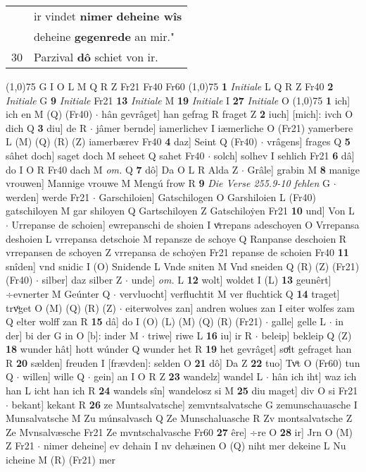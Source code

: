 \documentclass[8pt,a4paper,notitlepage]{article}
\begin{document}
\begin{table}[ht]
\begin{minipage}[t]{0.5\linewidth}
\begin{tabular}{rl}
 & ir vindet \textbf{nimer} \textbf{deheine wîs}\\ 
 & deheine \textbf{gegenrede} an mir."\\ 
30 & Parzival \textbf{dô} schiet von ir.\\ 
\end{tabular}
\scriptsize
\line(1,0){75} \newline
G I O L M Q R Z Fr21 Fr40 Fr60 \newline
\line(1,0){75} \newline
\textbf{1} \textit{Initiale} L Q R Z Fr40  \textbf{2} \textit{Initiale} G  \textbf{9} \textit{Initiale} Fr21  \textbf{13} \textit{Initiale} M  \textbf{19} \textit{Initiale} I  \textbf{27} \textit{Initiale} O  \newline
\line(1,0){75} \newline
\textbf{1} ich] ich en M (Q) (Fr40)  $\cdot$ hân gevrâget] han gefrag R fraget Z \textbf{2} iuch] [mich]: ivch O dich Q \textbf{3} diu] de R  $\cdot$ jâmer bernde] iamerlichev I iæmerliche O (Fr21) yamerbere L (M) (Q) (R) (Z) iamerbærev Fr40 \textbf{4} daz] Seint Q (Fr40)  $\cdot$ vrâgens] frages Q \textbf{5} sâhet doch] saget doch M seheet Q sahet Fr40  $\cdot$ solch] solhev I sehlich Fr21 \textbf{6} dâ] do I O R Fr40 dach M \textit{om.} Q \textbf{7} dô] Da O L R Alda Z  $\cdot$ Grâle] grabin M \textbf{8} manige vrouwen] Mannige vrouwe M Mengú frow R \textbf{9} \textit{Die Verse 255.9-10 fehlen} G   $\cdot$ werden] werde Fr21  $\cdot$ Garschiloien] Gatschilogen O Garshiloien L (Fr40) gatschiloyen M gar shiloyen Q Gartschiloyen Z Gatschiloẏen Fr21 \textbf{10} und] Von L  $\cdot$ Urrepanse de schoien] ewrepanschi de shoien I vͤrrepans adeschoyen O Vrrepansa deshoien L vrrepansa detschoie M repansze de schoye Q Ranpanse deschoien R vrrepansen de schoyen Z vrrepansa de schoẏen Fr21 repanse de schoien Fr40 \textbf{11} snîden] vnd snidic I (O) Snidende L Vnde sniten M Vnd sneiden Q (R) (Z) (Fr21) (Fr40)  $\cdot$ silber] daz silber Z  $\cdot$ unde] \textit{om.} L \textbf{12} wolt] woldet I (L) \textbf{13} geunêrt] ÷evnerter M Geúnter Q  $\cdot$ vervluocht] verfluchtit M ver fluchtick Q \textbf{14} traget] trvͦget O (M) (Q) (R) (Z)  $\cdot$ eiterwolves zan] andren wolues zan I eiter wolfes zam Q elter wolff zan R \textbf{15} dâ] do I (O) (L) (M) (Q) (R) (Fr21)  $\cdot$ galle] gelle L  $\cdot$ in der] bi der G in O [b]: inder M  $\cdot$ triwe] riwe L \textbf{16} iu] ir R  $\cdot$ beleip] bekleip Q (Z) \textbf{18} wunder hât] hott wúnder Q wunder het R \textbf{19} het gevrâget] soͯlt gefraget han R \textbf{20} sælden] freuden I [frævden]: selden O \textbf{21} dô] Da Z \textbf{22} tuo] Tvͦt O (Fr60) tun Q  $\cdot$ willen] wille Q  $\cdot$ gein] an I O R Z \textbf{23} wandelz] wandel L  $\cdot$ hân ich iht] waz ich han L icht han ich R \textbf{24} wandels sîn] wandelosz si M \textbf{25} diu maget] div O si Fr21  $\cdot$ bekant] kekant R \textbf{26} ze Muntsalvatsche] zemvntsalvatsche G zemunschauasche I Munsalvatsche M Zu múnsalvasch Q Ze Munschaluasche R Zv montsalvatsche Z Ze Mvnsalvæsche Fr21 Ze mvntschalvasche Fr60 \textbf{27} êre] ÷re O \textbf{28} ir] Jrn O (M) Z Fr21  $\cdot$ nimer deheine] ev dehain I nv dehæinen O (Q) niht mer dekeine L Nu icheine M (R) (Fr21) mer 
\end{minipage}
\end{table}
\end{document}
